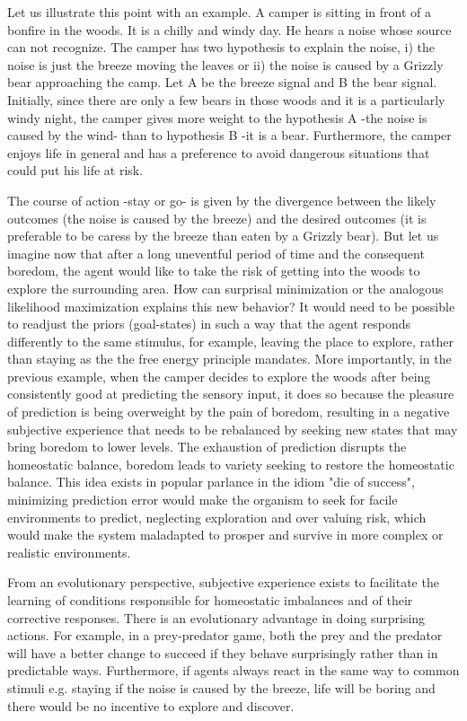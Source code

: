 \documentclass[11pt, onecolumn]{article}
\begin{document}
Let us illustrate this point with an example. A camper is sitting in front of a bonfire in the woods. It is a chilly and windy day. He hears a noise whose source can not recognize. The camper has two hypothesis to explain the noise, i) the noise is just the breeze moving the leaves or ii) the noise is caused by a Grizzly bear approaching the camp. Let A be the breeze signal and B the bear signal. Initially, since there are only a few bears in those woods and it is a particularly windy night, the camper gives more weight to the hypothesis A -the noise is caused by the wind- than to hypothesis B -it is a bear. Furthermore, the camper enjoys life in general and has a preference to avoid dangerous situations that could put his life at risk.  

The course of action -stay or go- is given by the divergence between the likely outcomes (the noise is caused by the breeze) and the desired outcomes (it is preferable to be caress by the breeze than eaten by a Grizzly bear). But let us imagine now that after a long uneventful period of time and the consequent boredom, the agent would like to take the risk of getting into the woods to explore the surrounding area. 
How can surprisal minimization or the analogous likelihood maximization explains  this new behavior? It would need to be possible to readjust the priors (goal-states) in such a way that the agent responds differently to the same stimulus, for example, leaving the place to explore, rather than staying as the the free energy principle mandates. 
More importantly, in the previous example, when the camper decides to explore the woods after being consistently good at predicting the sensory input, it does so because the pleasure of prediction is being overweight by the pain of boredom, resulting in a negative subjective experience that needs to be rebalanced by seeking new states that may bring boredom to lower levels. 
The exhaustion of prediction disrupts the homeostatic balance, boredom leads to variety seeking to restore the homeostatic balance. This idea exists in popular parlance in the idiom "die of success", minimizing prediction error would make the organism to seek for facile environments to predict, neglecting exploration and over valuing risk, which would make the system maladapted to prosper and survive in more complex or realistic environments. 

From an evolutionary perspective, subjective experience exists to facilitate
the learning of conditions responsible for homeostatic imbalances and
of their corrective responses. There is an evolutionary advantage in doing
surprising actions. For example, in a prey-predator game, both the prey and
the predator will have a better change to succeed if they behave surprisingly
rather than in predictable ways. Furthermore, if agents always react in the
same way to common stimuli e.g. staying if the noise is caused by the breeze, life will be boring and there would be no incentive to explore and discover.
\end{document}
